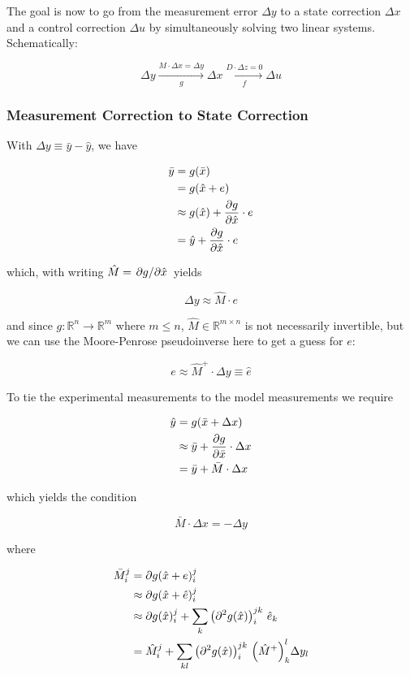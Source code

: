 \documentclass{article}
\begin{document}
The goal is now to go from the measurement error $\Delta y$ to a state correction $\Delta x$ and a control correction $\Delta u$ by simultaneously solving two linear systems.  Schematically:

$$
\Delta y \xrightarrow[g]{M \cdot \Delta x = \Delta y} \Delta x \xrightarrow[f]{D \cdot \Delta z = 0} \Delta u
$$

\subsubsection*{Measurement Correction to State Correction}

With $\Delta y \equiv \bar y - \hat y$, we have

\begin{align*}
  \bar y &= g(\bar x) \\
  &= g(\hat x + e) \\ 
  &\approx g(\hat x) + \pdv{g}{\hat x} \cdot e \\
  &= \hat y + \pdv{g}{\hat x} \cdot e  
\end{align*}

 
which, with writing $\hat M = \pdv*{g}{\hat x} $ yields

$$
\Delta y \approx \hat M \cdot e 
$$


and since $g: \mathbb{R}^n \to \mathbb{R}^m$ where $m \leq n$, $\hat M \in \mathbb{R}^{m \times n}$ is not necessarily invertible, but we can use the Moore-Penrose pseudoinverse here to get a guess for $e$:

$$
\boxed{
e \approx \hat M^+ \cdot \Delta y \equiv \hat e 
}
$$



To tie the experimental measurements to the model measurements we require 

\begin{align*}
\hat y &= g(\bar x + \Delta x) \\ 
&\approx \bar y + \pdv{g}{\bar x} \cdot \Delta x \\
&= \bar y + \bar M \cdot \Delta x
\end{align*}


which yields the condition

\begin{equation}
  \boxed{
  \bar M \cdot \Delta x = - \Delta y
  }
\end{equation}



where

\begin{align*}
  \bar M_i^j &= \partial g(\hat x + e)_i^j \\
  & \approx  \partial g(\hat x + \hat e)_i^j \\
  & \approx \partial g(\hat x)_i^j + \sum_k \qty(\partial^2 g(\hat x))_i^{jk} \ \hat e_k \\
  &= \hat M_i^j + \sum_{kl} \qty(\partial^2 g(\hat x))_i^{jk} \ \qty(\hat M^+)_k^l \Delta y_l 
\end{align*}
\end{document}

